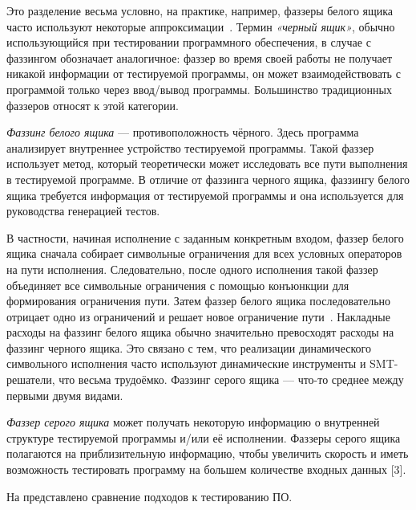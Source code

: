 	Это разделение весьма условно, на практике, например, фаззеры белого ящика часто используют некоторые аппроксимации~\cite{???}. Термин \textit{«черный ящик»}, обычно использующийся при тестировании программного обеспечения, в случае с фаззингом обозначает аналогичное: фаззер во время своей работы не получает никакой информации от тестируемой программы, он может взаимодействовать с программой только через ввод/вывод программы. Большинство традиционных фаззеров относят к этой категории. 
	\par
	\textit{Фаззинг белого ящика} — противоположность чёрного. Здесь программа анализирует внутреннее устройство тестируемой программы.
	Такой фаззер использует метод, который теоретически может исследовать все пути выполнения в тестируемой программе. В отличие от фаззинга черного ящика, фаззингу белого ящика требуется информация от тестируемой программы и она используется для руководства генерацией тестов. 
	
	В частности, начиная исполнение с заданным конкретным входом, фаззер белого ящика сначала собирает символьные ограничения для всех условных операторов на пути исполнения. Следовательно, после одного исполнения такой фаззер объединяет все символьные ограничения с помощью конъюнкции для формирования ограничения пути. Затем фаззер белого ящика последовательно отрицает одно из ограничений и решает новое ограничение пути~\cite{???}. Накладные расходы на фаззинг белого ящика обычно значительно превосходят расходы на фаззинг черного ящика. Это связано с тем, что реализации динамического символьного исполнения часто используют динамические инструменты и SMT-решатели, что весьма трудоёмко. Фаззинг серого ящика — что-то среднее между первыми двумя видами. 
	\par
	\textit{Фаззер серого ящика} может получать некоторую информацию о внутренней структуре тестируемой программы и/или её исполнении. Фаззеры серого ящика полагаются на приблизительную информацию, чтобы увеличить скорость и иметь возможность тестировать программу на большем количестве входных данных [3].
	
	На  представлено сравнение подходов к тестированию ПО.
	
